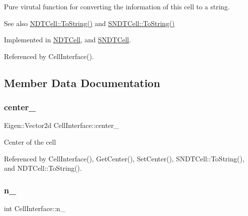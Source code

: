 Pure virutal function for converting the information of this cell to a string. 

\begin{DoxySeeAlso}{See also}
\hyperlink{classNDTCell_ab0243b5d87bfad3884a400681b9c46fa}{N\+D\+T\+Cell\+::\+To\+String()} and \hyperlink{classSNDTCell_a396e9b04c4ce9976868b0b3f12aa1021}{S\+N\+D\+T\+Cell\+::\+To\+String()} 
\end{DoxySeeAlso}


Implemented in \hyperlink{classNDTCell_ab0243b5d87bfad3884a400681b9c46fa}{N\+D\+T\+Cell}, and \hyperlink{classSNDTCell_a396e9b04c4ce9976868b0b3f12aa1021}{S\+N\+D\+T\+Cell}.



Referenced by Cell\+Interface().



\subsection{Member Data Documentation}
\mbox{\label{classCellInterface_ab7d0bf5e6519c77f07a249387c8be576}} 
\subsubsection{\texorpdfstring{center\+\_\+}{center\_}}
{\footnotesize\ttfamily Eigen\+::\+Vector2d Cell\+Interface\+::center\+\_\+\hspace{0.3cm}{\ttfamily [protected]}}

Center of the cell 

Referenced by Cell\+Interface(), Get\+Center(), Set\+Center(), S\+N\+D\+T\+Cell\+::\+To\+String(), and N\+D\+T\+Cell\+::\+To\+String().

\mbox{\label{classCellInterface_a779f8e1459ebe2a33215b6931ae6c165}} 
\subsubsection{\texorpdfstring{n\+\_\+}{n\_}}
{\footnotesize\ttfamily int Cell\+Interface\+::n\+\_\+\hspace{0.3cm}{\ttfamily [protected]}}

